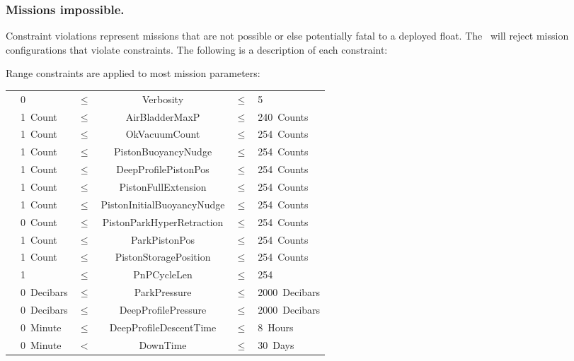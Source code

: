 \subsubsection{Missions impossible.}

Constraint violations represent missions that are not possible or else
potentially fatal to a deployed float.  The \cs\ will reject mission
configurations that violate constraints.  The following is a description of
each constraint:

\begin{description}
\begin{minipage}{6in}
\item[\textnormal{Range constraints are applied to most mission parameters:}]\ \\ 
  \begin{tabular}{llcccl} 
    & 0          & $\le$ & Verbosity                  & $\le$ & 5             \\
    & 1~Count    & $\le$ & AirBladderMaxP             & $\le$ & 240~Counts    \\
    & 1~Count    & $\le$ & OkVacuumCount              & $\le$ & 254~Counts    \\
    & 1~Count    & $\le$ & PistonBuoyancyNudge        & $\le$ & 254~Counts    \\
    & 1~Count    & $\le$ & DeepProfilePistonPos       & $\le$ & 254~Counts    \\
    & 1~Count    & $\le$ & PistonFullExtension        & $\le$ & 254~Counts    \\
    & 1~Count    & $\le$ & PistonInitialBuoyancyNudge & $\le$ & 254~Counts    \\
    & 0~Count    & $\le$ & PistonParkHyperRetraction  & $\le$ & 254~Counts    \\
    & 1~Count    & $\le$ & ParkPistonPos              & $\le$ & 254~Counts    \\
    & 1~Count    & $\le$ & PistonStoragePosition      & $\le$ & 254~Counts    \\
    & 1          & $\le$ & PnPCycleLen                & $\le$ & 254           \\
    & 0~Decibars & $\le$ & ParkPressure               & $\le$ & 2000~Decibars \\
    & 0~Decibars & $\le$ & DeepProfilePressure        & $\le$ & 2000~Decibars \\
    & 0~Minute   & $\le$ & DeepProfileDescentTime     & $\le$ & 8~Hours       \\
    & 0~Minute   & $<$   & DownTime                   & $\le$ & 30~Days       \\

\end{tabular}
\end{minipage}
\end{description}
